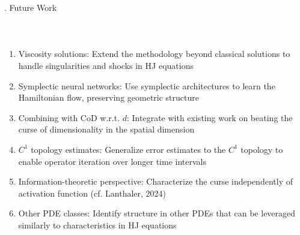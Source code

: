 \documentclass{beamer}
\def\b{\color{blue}}
\begin{document}
\begin{frame}{\thesection. Future Work}
\framesubtitle{$\quad$}
{\Large 
\begin{enumerate}
    \item {\b Viscosity solutions}: Extend the methodology beyond classical solutions to handle singularities and shocks in HJ equations
    \item {\b Symplectic neural networks}: Use symplectic architectures to learn the Hamiltonian flow, preserving geometric structure
    \item {\b Combining with CoD w.r.t. $ d $}: Integrate with existing work on beating the curse of dimensionality in the spatial dimension
    \item {\b $ C^1 $ topology estimates}: Generalize error estimates to the $ C^1 $ topology to enable operator iteration over longer time intervals
    \item {\b Information-theoretic perspective}: Characterize the curse independently of activation function (cf. Lanthaler, 2024)
    \item {\b Other PDE classes}: Identify structure in other PDEs that can be leveraged similarly to characteristics in HJ equations
\end{enumerate}
}

\end{frame}

\backmatter
\end{document}

